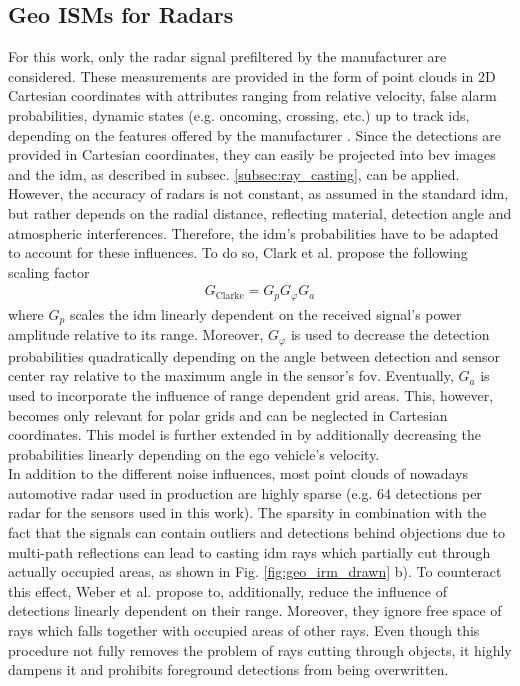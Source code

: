 \subsection{Geo ISMs for Radars}
\label{subsec:geo_ism_radar}
For this work, only the radar signal prefiltered by the manufacturer are considered. These measurements are provided in the form of point clouds in 2D Cartesian coordinates with attributes ranging from relative velocity, false alarm probabilities, dynamic states (e.g. oncoming, crossing, etc.) up to track ids, depending on the features offered by the manufacturer \cite{caesar2020nuscenes}. Since the detections are provided in Cartesian coordinates, they can easily be projected into \gls{bev} images and the \gls{idm}, as described in subsec. \ref{subsec:ray_casting}, can be applied.
\\
However, the accuracy of radars is not constant, as assumed in the standard \gls{idm}, but rather depends on the radial distance, reflecting material, detection angle and atmospheric interferences. Therefore, the \gls{idm}'s probabilities have to be adapted to account for these influences. To do so, Clark et al. \cite{clarke2012sensor} propose the following scaling factor
\begin{align}
	\label{eq:clarke_scaling}
	G_{\text{Clarke}} = G_p G_\varphi G_a
\end{align}
where $G_p$ scales the \gls{idm} linearly dependent on the received signal's power amplitude relative to its range. Moreover, $G_\varphi$ is used to decrease the detection probabilities quadratically depending on the angle between detection and sensor center ray relative to the maximum angle in the sensor's \gls{fov}. Eventually, $G_a$ is used to incorporate the influence of range dependent grid areas. This, however, becomes only relevant for polar grids and can be neglected in Cartesian coordinates. This model is further extended in \cite{prophet2018adaptions} by additionally decreasing the probabilities linearly depending on the ego vehicle's velocity.
\\
In addition to the different noise influences, most point clouds of nowadays automotive radar used in production are highly sparse (e.g. 64 detections per radar for the sensors used in this work). The sparsity in combination with the fact that the signals can contain outliers and detections behind objections due to multi-path reflections can lead to casting \gls{idm} rays which partially cut through actually occupied areas, as shown in Fig. \ref{fig:geo_irm_drawn} b). To counteract this effect, Weber et al. \cite{werber2015automotive} propose to, additionally, reduce the influence of detections linearly dependent on their range. Moreover, they ignore free space of rays which falls together with occupied areas of other rays. Even though this procedure not fully removes the problem of rays cutting through objects, it highly dampens it and prohibits foreground detections from being overwritten.
